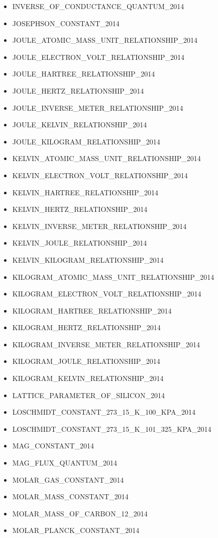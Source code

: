 \begin{itemize}
\item INVERSE\_OF\_CONDUCTANCE\_QUANTUM\_2014
\item JOSEPHSON\_CONSTANT\_2014
\item JOULE\_ATOMIC\_MASS\_UNIT\_RELATIONSHIP\_2014
\item JOULE\_ELECTRON\_VOLT\_RELATIONSHIP\_2014
\item JOULE\_HARTREE\_RELATIONSHIP\_2014
\item JOULE\_HERTZ\_RELATIONSHIP\_2014
\item JOULE\_INVERSE\_METER\_RELATIONSHIP\_2014
\item JOULE\_KELVIN\_RELATIONSHIP\_2014
\item JOULE\_KILOGRAM\_RELATIONSHIP\_2014
\item KELVIN\_ATOMIC\_MASS\_UNIT\_RELATIONSHIP\_2014
\item KELVIN\_ELECTRON\_VOLT\_RELATIONSHIP\_2014
\item KELVIN\_HARTREE\_RELATIONSHIP\_2014
\item KELVIN\_HERTZ\_RELATIONSHIP\_2014
\item KELVIN\_INVERSE\_METER\_RELATIONSHIP\_2014
\item KELVIN\_JOULE\_RELATIONSHIP\_2014
\item KELVIN\_KILOGRAM\_RELATIONSHIP\_2014
\item KILOGRAM\_ATOMIC\_MASS\_UNIT\_RELATIONSHIP\_2014
\item KILOGRAM\_ELECTRON\_VOLT\_RELATIONSHIP\_2014
\item KILOGRAM\_HARTREE\_RELATIONSHIP\_2014
\item KILOGRAM\_HERTZ\_RELATIONSHIP\_2014
\item KILOGRAM\_INVERSE\_METER\_RELATIONSHIP\_2014
\item KILOGRAM\_JOULE\_RELATIONSHIP\_2014
\item KILOGRAM\_KELVIN\_RELATIONSHIP\_2014
\item LATTICE\_PARAMETER\_OF\_SILICON\_2014
\item LOSCHMIDT\_CONSTANT\_273\_15\_K\_100\_KPA\_2014
\item LOSCHMIDT\_CONSTANT\_273\_15\_K\_101\_325\_KPA\_2014
\item MAG\_CONSTANT\_2014
\item MAG\_FLUX\_QUANTUM\_2014
\item MOLAR\_GAS\_CONSTANT\_2014
\item MOLAR\_MASS\_CONSTANT\_2014
\item MOLAR\_MASS\_OF\_CARBON\_12\_2014
\item MOLAR\_PLANCK\_CONSTANT\_2014

\end{itemize}
